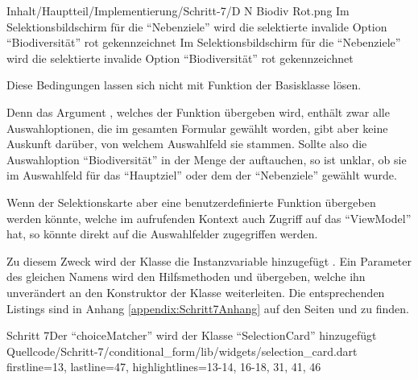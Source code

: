 \begin{alexfigure}{Inhalt/Hauptteil/Implementierung/Schritt-7/D N Biodiv Rot.png}
  {Im Selektionsbildschirm für die \enquote{Nebenziele} wird die selektierte invalide Option \enquote{Biodiversität} rot gekennzeichnet}
  {Im Selektionsbildschirm für die \enquote{Nebenziele} wird die selektierte invalide Option \enquote{Biodiversität} rot gekennzeichnet}

  \label{fig:Schritt4EingabemaskeDNBiodivRot}

\end{alexfigure}




Diese Bedingungen lassen sich nicht mit Funktion  der Basisklasse  lösen.

Denn das Argument ,
welches der Funktion  übergeben wird,
enthält zwar alle Auswahloptionen,
die im gesamten Formular gewählt worden,
gibt aber keine Auskunft darüber,
von welchem Auswahlfeld sie stammen. 
Sollte also die Auswahloption \enquote{Biodiversität} in der Menge der  auftauchen,
so ist unklar,
ob sie im Auswahlfeld für das \enquote{Hauptziel} oder dem der \enquote{Nebenziele} gewählt wurde.

Wenn der Selektionskarte aber eine benutzerdefinierte Funktion übergeben werden könnte,
welche im aufrufenden Kontext auch Zugriff auf das \enquote{ViewModel} hat,
so könnte direkt auf die Auswahlfelder zugegriffen werden.


Zu diesem Zweck wird der Klasse  die Instanzvariable  hinzugefügt .
Ein Parameter des gleichen Namens wird den Hilfsmethoden  und  übergeben, welche ihn unverändert an den Konstruktor der Klasse  weiterleiten.
Die entsprechenden Listings sind in Anhang \ref{appendix:Schritt7Anhang} auf den Seiten \pageref{lst:Schritt7AppendixbuildSelectionCard} und \pageref{lst:Schritt7buildMultiSelectionCard} zu finden.






\begin{alexlisting}{Schritt 7}{Der \enquote{choiceMatcher} wird der Klasse \enquote{SelectionCard} hinzugefügt}
  {Quellcode/Schritt-7/conditional_form/lib/widgets/selection_card.dart}
  {firstline=13, lastline=47, highlightlines={13-14, 16-18, 31, 41, 46}}
  \label{lst:Schritt7SelectionCard}
\end{alexlisting}

